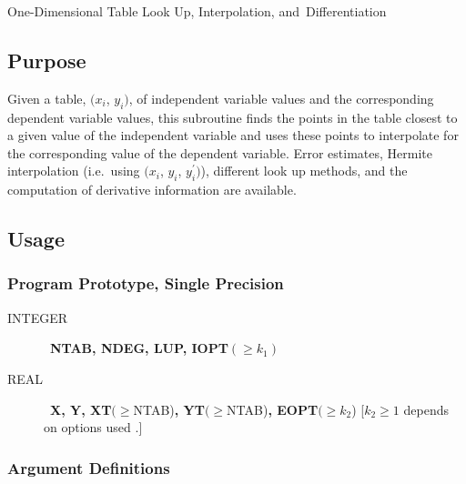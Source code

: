 \documentclass[twoside]{MATH77}
\begin{document}
 One-Dimensional Table Look Up, Interpolation, \hbox{and Differentiation}


\subsection{Purpose}

Given a table, $(x_i$, $y_i)$, of independent variable values and the
corresponding dependent variable values, this subroutine finds the
points in the table closest to a given value of the independent
variable and uses these points to interpolate for the corresponding
value of the dependent variable.  Error estimates, Hermite
interpolation (i.e.\ using $(x_i$, $y_i$, $y_i^\prime)$), different
look up methods, and the computation of derivative information are
available.

\subsection{Usage}

\subsubsection{Program Prototype, Single Precision}

\begin{description}
\item[INTEGER]  \ {\bf NTAB, NDEG, LUP, IOPT}$(\geq k_1)$

\item[REAL]  \ {\bf X, Y, XT}$(\geq $NTAB){\bf , YT}$(\geq $NTAB){\bf ,\newline
EOPT}$(\geq k_2$) [$k_2 \geq 1$ depends on options used .]
\end{description}
\begin{center}
\end{center}

\subsubsection{Argument Definitions}
\end{document}
